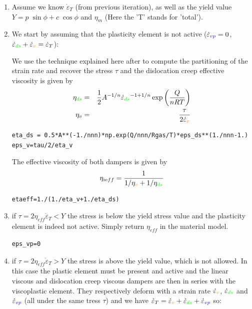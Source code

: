 \begin{enumerate}
\item Assume we know $\dot\varepsilon_T$ (from previous iteration), 
as well as the yield value  $Y = p\; \sin\phi + c \; \cos \phi$ and $\eta_m$ (Here the 'T' stands 
for 'total').

\item We start by assuming that the plasticity element is not active 
($\dot{\varepsilon}_{\color{blue}vp}=0$, $\dot{\varepsilon}_{\color{green}ds}
+\dot{\varepsilon}_{\color{orange} v} =\dot{\varepsilon}_T$): 

We use the technique explained here after to compute the partitioning of the strain rate
and recover the stress $\tau$ and the dislocation creep effective viscosity
is given by 
\begin{eqnarray}
\eta_{\color{green}ds} &=& \frac{1}{2} A^{-1/n} 
\dot{\varepsilon}_{\color{green}ds}^{-1+1/n} \exp \left( \frac{Q}{nRT} \right) \nonumber\\
\eta_v &=& \frac{\tau}{2 \dot{\varepsilon}_{\color{orange}v}}  \nonumber
\end{eqnarray}
\begin{lstlisting}
eta_ds = 0.5*A**(-1./nnn)*np.exp(Q/nnn/Rgas/T)*eps_ds**(1./nnn-1.)
eps_v=tau/2/eta_v
\end{lstlisting}
The effective viscosity of both dampers is given by 
\[
\eta_{i\text eff}=\frac{1}{1/\eta_{\color{orange}v}+1/\eta_{\color{green}ds}}
\]
\begin{lstlisting}
etaeff=1./(1./eta_v+1./eta_ds)
\end{lstlisting}

\item if $\tau =2 {\eta}_{eff} \dot\varepsilon_T < Y$ the stress is below the yield stress value 
and the plasticity element is indeed not active. 
Simply return ${\eta}_{eff}$ in the material model.
\begin{lstlisting}
eps_vp=0
\end{lstlisting}

\item if $\tau=2 \eta_{eff} \dot\varepsilon_T > Y$ the stress is above the 
yield value, which is not allowed. In this case the plastic element must be present 
and active and the linear viscous and dislocation creep viscous dampers are then 
in series with the viscoplastic element. 
They  respectively deform with a strain rate $\dot{\varepsilon}_{\color{orange}v}$, 
$\dot{\varepsilon}_{\color{green}ds}$ and $\dot\varepsilon_{\color{blue}vp}$ 
(all under the same tress $\tau$) 
and we have  
$\dot\varepsilon_T = \dot{\varepsilon}_{\color{orange}v} +
\dot{\varepsilon}_{\color{green}ds} + \dot\varepsilon_{\color{blue}vp}$ so:


\end{enumerate}
